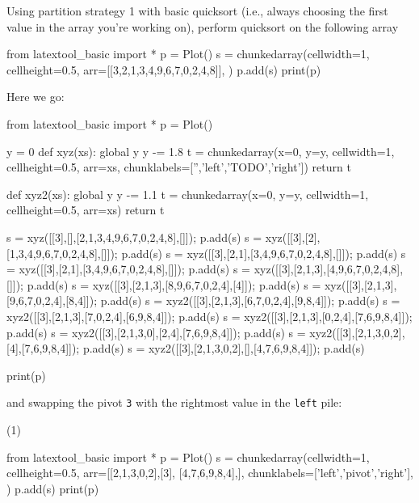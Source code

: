 \begin{ex}
Using partition strategy 1 with basic quicksort
(i.e., always choosing the first value in the array you're working on), 
perform quicksort on the following array

\begin{python}
from latextool_basic import *
p = Plot()
s = chunkedarray(cellwidth=1, 
                   cellheight=0.5,
                   arr=[[3,2,1,3,4,9,6,7,0,2,4,8]],
)
p.add(s)
print(p)
\end{python}

Here we go:

{\small
\begin{python}
from latextool_basic import *
p = Plot()

y = 0
def xyz(xs):
    global y
    y -= 1.8
    t = chunkedarray(x=0, y=y,
                        cellwidth=1, 
                        cellheight=0.5,
                        arr=xs,
                        chunklabels=['','left','TODO','right'])
    return t

def xyz2(xs):
    global y
    y -= 1.1
    t = chunkedarray(x=0, y=y,
                        cellwidth=1, 
                        cellheight=0.5,
                        arr=xs)
    return t

s = xyz([[3],[],[2,1,3,4,9,6,7,0,2,4,8],[]]); p.add(s)
s = xyz([[3],[2],[1,3,4,9,6,7,0,2,4,8],[]]); p.add(s)
s = xyz([[3],[2,1],[3,4,9,6,7,0,2,4,8],[]]); p.add(s)
s = xyz([[3],[2,1],[3,4,9,6,7,0,2,4,8],[]]); p.add(s)
s = xyz([[3],[2,1,3],[4,9,6,7,0,2,4,8],[]]); p.add(s)
s = xyz([[3],[2,1,3],[8,9,6,7,0,2,4],[4]]); p.add(s)
s = xyz([[3],[2,1,3],[9,6,7,0,2,4],[8,4]]); p.add(s)
s = xyz2([[3],[2,1,3],[6,7,0,2,4],[9,8,4]]); p.add(s)
s = xyz2([[3],[2,1,3],[7,0,2,4],[6,9,8,4]]); p.add(s)
s = xyz2([[3],[2,1,3],[0,2,4],[7,6,9,8,4]]); p.add(s)
s = xyz2([[3],[2,1,3,0],[2,4],[7,6,9,8,4]]); p.add(s)
s = xyz2([[3],[2,1,3,0,2],[4],[7,6,9,8,4]]); p.add(s)
s = xyz2([[3],[2,1,3,0,2],[],[4,7,6,9,8,4]]); p.add(s)

print(p)
\end{python}
}

and swapping the pivot \verb!3! with the rightmost value in the \verb!left!
pile:
\begin{center}
(1)
\end{center}
{\small
\begin{python}
from latextool_basic import *
p = Plot()
s = chunkedarray(cellwidth=1,
                   cellheight=0.5,
                   arr=[[2,1,3,0,2],[3], [4,7,6,9,8,4],],
                   chunklabels=['left','pivot','right'],
)
p.add(s)
print(p)
\end{python}
}


\end{ex}
